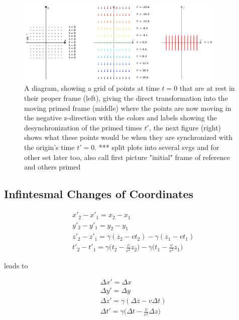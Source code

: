 \begin{figure}[H]
	\centering
	\includegraphics[width=10cm]{images/pdf/coordinate_transforms.pdf}
	\caption{A diagram, showing a grid of points at time $t=0$ that are at rest in their proper frame (left), giving the direct transformation into the moving primed frame (middle) where the points are now moving in the negative z-direction with the colors and labels showing the desynchronization of the primed times $t{'}$, the next figure (right) shows what these points would be when they are synchronized with the origin's time $t{'}=0$. *** split plots into several svgs and for other set later too, also call first picture "initial" frame of reference and others primed}
	\label{fig: coordinate transform}
\end{figure}

\subsection{Infintesmal Changes of Coordinates}

\begin{equation}
	\begin{aligned}
		 & x{'}_2 - x{'}_1 = x_2 - x_1                                                                                   \\
		 & y{'}_2 - y{'}_1 = y_2 - y_1                                                                                   \\
		 & z{'}_2 - z{'}_1 = {\gamma} ( z_2 - v {t}_2) - {\gamma} ( z_1 - v {t}_1)                                           \\
		 & t{'}_2 - t{'}_1={\gamma} \bigg( {t}_2-\frac{v}{c^2} z_2 \bigg) - {\gamma} \bigg( {t}_1 - \frac{v}{c^2} z_1 \bigg)
	\end{aligned}
\end{equation}

leads to

\begin{equation}
	\label{eq: interval of Coordinates}
	\begin{aligned}
		 & \Delta x{'}= \Delta x                                              \\
		 & \Delta y{'}= \Delta y                                              \\
		 & \Delta z{'} = {\gamma} ( \Delta z-v \Delta t)                      \\
		 & \Delta t{'}={\gamma} \bigg( \Delta t-\frac{v}{c^2} \Delta z \bigg)
	\end{aligned}
\end{equation}

